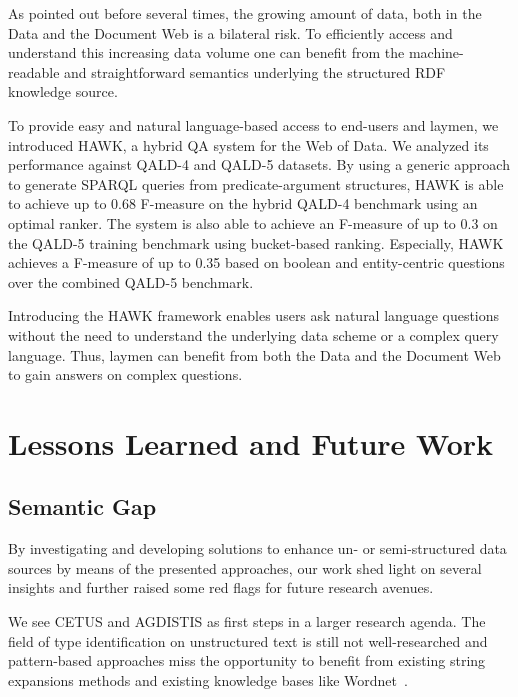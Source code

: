 As pointed out before several times, the growing amount of data, both in the Data and the Document Web is a bilateral risk. 
To efficiently access and understand this increasing data volume one can benefit from the machine-readable and straightforward semantics underlying the structured RDF knowledge source. 

To provide easy and natural language-based access to end-users and laymen, we introduced HAWK, a hybrid \ac{QA} system for the Web of Data.
We analyzed its performance against \ac{QALD}-4 and \ac{QALD}-5 datasets.
By using a generic approach to generate SPARQL queries from predicate-argument structures,   HAWK is able to achieve up to 0.68 F-measure on the hybrid \ac{QALD}-4 benchmark using an optimal ranker.
The system is also able to achieve an F-measure of up to 0.3 on the \ac{QALD}-5 training benchmark using bucket-based ranking.
Especially, HAWK achieves a F-measure of up to 0.35 based on boolean and entity-centric questions over the combined \ac{QALD}-5 benchmark.

Introducing the HAWK framework enables users ask natural language questions without the need to understand the underlying data scheme or a complex query language. 
Thus, laymen can benefit from both the Data and the Document Web to gain answers on complex questions. 



\section{Lessons Learned and Future Work}
\subsection*{Semantic Gap}

By investigating and developing solutions to enhance un- or semi-structured data sources by means of the presented approaches, our work shed light on several insights and further raised some red flags for future research avenues. 

We see CETUS and AGDISTIS as first steps in a larger research agenda.
The field of type identification on unstructured text is still not well-researched and pattern-based approaches miss the opportunity to benefit from existing string expansions methods and existing knowledge bases like Wordnet~\cite{wordnet}.


